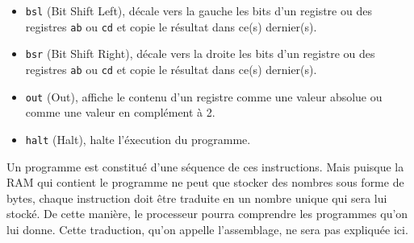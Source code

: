 \documentclass{article}
\begin{document}
\begin{itemize}
    \item \texttt{bsl} (Bit Shift Left), décale vers la gauche les bits d'un registre ou des registres \texttt{ab} ou \texttt{cd} et copie le résultat dans ce(s) dernier(s).
    \item \texttt{bsr} (Bit Shift Right), décale vers la droite les bits d'un registre ou des registres \texttt{ab} ou \texttt{cd} et copie le résultat dans ce(s) dernier(s).
    \item \texttt{out} (Out), affiche le contenu d'un registre comme une valeur absolue ou comme une valeur en complément à 2.
    \item \texttt{halt} (Halt), halte l'éxecution du programme.
\end{itemize}
Un programme est constitué d'une séquence de ces instructions. Mais puisque la RAM qui contient le programme ne peut que stocker des nombres sous forme de bytes, chaque instruction doit être traduite en un nombre unique qui sera lui stocké. De cette manière, le processeur pourra comprendre les programmes qu'on lui donne. Cette traduction, qu'on appelle l'assemblage, ne sera pas expliquée ici. \cite{salomon1992assemblers}
\newpage
\end{document}
